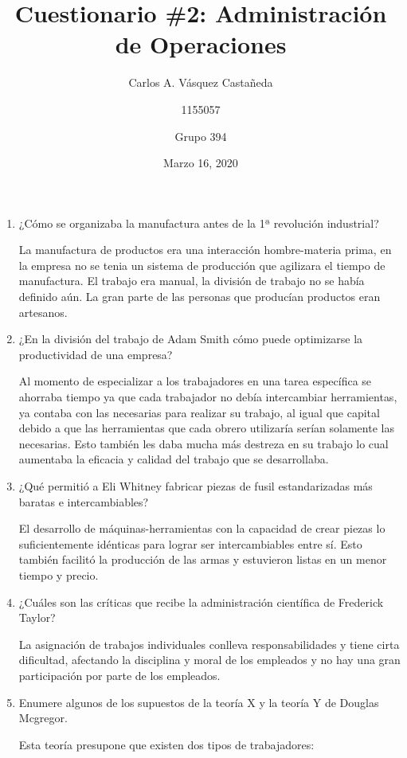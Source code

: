 \documentclass[12pt, letterpaper]{article}
\title{Cuestionario \#2: Administración de Operaciones}
\author{Carlos A. Vásquez Castañeda \and 1155057 \and Grupo 394}
\date{Marzo 16, 2020}
\begin{document}
\maketitle

\begin{enumerate}
	\item ¿Cómo se organizaba la manufactura antes de la 1ª revolución industrial?

		La manufactura de productos era una interacción hombre-materia prima, en la empresa no se tenia un sistema de producción que agilizara el tiempo de manufactura. El trabajo era manual, la división de trabajo no se había definido aún. La gran parte de las personas que producían productos eran artesanos.

	\item ¿En la división del trabajo de Adam Smith cómo puede optimizarse la productividad de una empresa?

		Al momento de especializar a los trabajadores en una tarea específica se ahorraba tiempo ya que cada trabajador no debía intercambiar herramientas, ya contaba con las necesarias para realizar su trabajo, al igual que capital debido a que las herramientas que cada obrero utilizaría serían solamente las necesarias. Esto también les daba mucha más destreza en su trabajo lo cual aumentaba la eficacia y calidad del trabajo que se desarrollaba.

	\item ¿Qué permitió a Eli Whitney fabricar piezas de fusil estandarizadas más baratas e intercambiables?

		El desarrollo de máquinas-herramientas con la capacidad de crear piezas lo suficientemente idénticas para lograr ser intercambiables entre sí. Esto también facilitó la producción de las armas y estuvieron listas en un menor tiempo y precio.

	\item ¿Cuáles son las críticas que recibe la administración científica de Frederick Taylor?

		La asignación de trabajos individuales conlleva responsabilidades y tiene cirta dificultad, afectando la disciplina y moral de los empleados y no hay una gran participación por parte de los empleados.

	\item Enumere algunos de los supuestos de la teoría X y la teoría Y de Douglas Mcgregor.
		
		Esta teoría presupone que existen dos tipos de trabajadores:


\end{enumerate}
\end{document}
